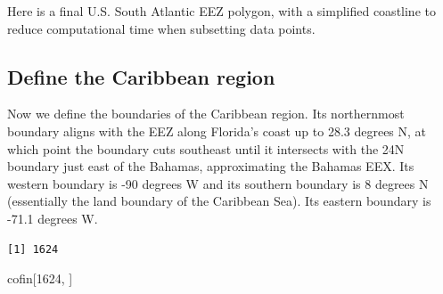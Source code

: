 \documentclass[
]{article}
\newenvironment{Shaded}{\begin{snugshade}}{\end{snugshade}}
\newcommand{\CommentTok}[1]{\textcolor[rgb]{0.37,0.37,0.37}{#1}}
\newcommand{\DecValTok}[1]{\textcolor[rgb]{0.68,0.00,0.00}{#1}}
\newcommand{\FunctionTok}[1]{\textcolor[rgb]{0.28,0.35,0.67}{#1}}
\newcommand{\NormalTok}[1]{\textcolor[rgb]{0.00,0.23,0.31}{#1}}
\newcommand{\OtherTok}[1]{\textcolor[rgb]{0.00,0.23,0.31}{#1}}
\newcommand{\SpecialCharTok}[1]{\textcolor[rgb]{0.37,0.37,0.37}{#1}}
\begin{document}
\begin{Shaded}
\end{Shaded}

Here is a final U.S. South Atlantic EEZ polygon, with a simplified
coastline to reduce computational time when subsetting data points.

\subsection{Define the Caribbean
region}\label{define-the-caribbean-region}

Now we define the boundaries of the Caribbean region. Its northernmost
boundary aligns with the EEZ along Florida's coast up to 28.3 degrees N,
at which point the boundary cuts southeast until it intersects with the
24N boundary just east of the Bahamas, approximating the Bahamas EEX.
Its western boundary is -90 degrees W and its southern boundary is 8
degrees N (essentially the land boundary of the Caribbean Sea). Its
eastern boundary is -71.1 degrees W.

\begin{Shaded}
\end{Shaded}

\begin{verbatim}
[1] 1624
\end{verbatim}

\begin{Shaded}
\begin{Highlighting}[]
\NormalTok{cofin[}\DecValTok{1624}\NormalTok{, ]}
\end{Highlighting}
\end{Shaded}
\end{document}
